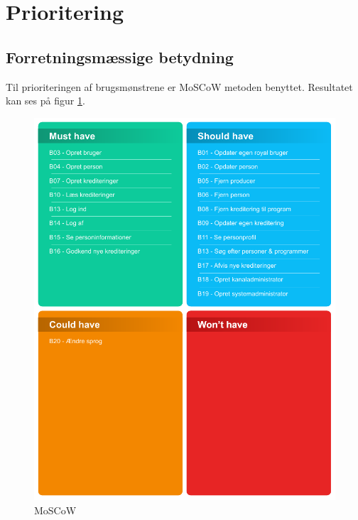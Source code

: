 \section{Prioritering}
\subsection{Forretningsmæssige betydning}
\noindent
Til prioriteringen af brugsmønstrene er MoSCoW metoden benyttet. Resultatet kan ses på figur \ref{fig:moscow}.\\

\begin{figure}[h]
\centering
\includegraphics[scale=1]{figures/MoSCoW.pdf}
\caption{MoSCoW}
\label{fig:moscow}
\end{figure}

